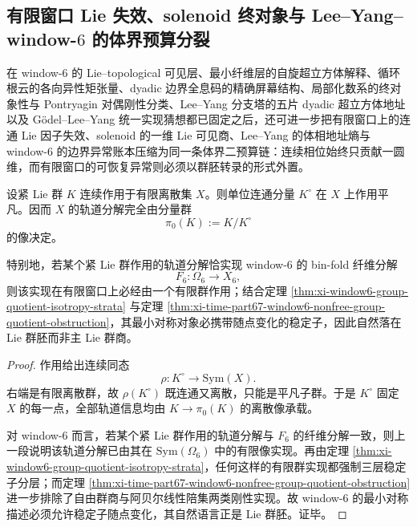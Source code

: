 \subsection{有限窗口 Lie 失效、solenoid 终对象与 Lee--Yang--window-\texorpdfstring{$6$}{6} 的体界预算分裂}\label{subsec:conclusion-finitewindow-solenoid-leyang-window6-budget-splitting}
在 window-\(6\) 的 Lie--topological 可见层、最小纤维层的自旋超立方体解释、循环根云的各向异性矩张量、dyadic 边界全息码的精确屏幕结构、局部化数系的终对象性与 Pontryagin 对偶刚性分类、Lee--Yang 分支塔的五片 dyadic 超立方体地址以及 Gödel--Lee--Yang 统一实现猜想都已固定之后，还可进一步把有限窗口上的连通 Lie 因子失效、solenoid 的一维 Lie 可见商、Lee--Yang 的体相地址熵与 window-\(6\) 的边界异常账本压缩为同一条体界二预算链：连续相位始终只贡献一圆维，而有限窗口的可恢复异常则必须以群胚转录的形式外置。

\begin{theorem}\label{thm:conclusion-finite-window-connected-lie-factor-collapse}
设紧 Lie 群 \(K\) 连续作用于有限离散集 \(X\)。则单位连通分量 \(K^\circ\) 在 \(X\) 上作用平凡。因而 \(X\) 的轨道分解完全由分量群
\[
\pi_0(K):=K/K^\circ
\]
的像决定。

特别地，若某个紧 Lie 群作用的轨道分解恰实现 window-\(6\) 的 bin-fold 纤维分解
\[
F_6:\Omega_6\to X_6,
\]
则该实现在有限窗口上必经由一个有限群作用；结合定理 \ref{thm:xi-window6-group-quotient-isotropy-strata} 与定理 \ref{thm:xi-time-part67-window6-nonfree-group-quotient-obstruction}，其最小对称对象必携带随点变化的稳定子，因此自然落在 Lie 群胚而非主 Lie 群商。
\end{theorem}
\begin{proof}
作用给出连续同态
\[
\rho:K^\circ\longrightarrow \mathrm{Sym}(X).
\]
右端是有限离散群，故 \(\rho(K^\circ)\) 既连通又离散，只能是平凡子群。于是 \(K^\circ\) 固定 \(X\) 的每一点，全部轨道信息均由 \(K\to \pi_0(K)\) 的离散像承载。

对 window-\(6\) 而言，若某个紧 Lie 群作用的轨道分解与 \(F_6\) 的纤维分解一致，则上一段说明该轨道分解已由其在 \(\mathrm{Sym}(\Omega_6)\) 中的有限像实现。再由定理 \ref{thm:xi-window6-group-quotient-isotropy-strata}，任何这样的有限群实现都强制三层稳定子分层；而定理 \ref{thm:xi-time-part67-window6-nonfree-group-quotient-obstruction} 进一步排除了自由群商与阿贝尔线性陪集两类刚性实现。故 window-\(6\) 的最小对称描述必须允许稳定子随点变化，其自然语言正是 Lie 群胚。证毕。
\end{proof}

